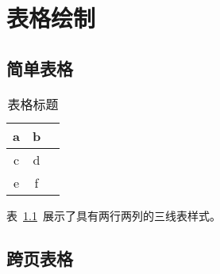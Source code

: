 \chapter{表格绘制}

\section{简单表格}

\begin{table}[htbp]
  \centering
  \caption{表格标题}\label{tab:simpletable}
  \begin{tabular}{ccc}
    \hline
    a & b \\ %
    \hline
    c & d \\
    e & f \\
    \hline
  \end{tabular}
\end{table}

表~\ref{tab:simpletable}~展示了具有两行两列的三线表样式。

\section{跨页表格}

